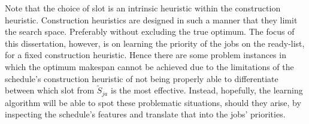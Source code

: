 \begin{comment} %
Preliminary experiments which at each time step all jobs on the ready-list are explored and dispatched according to a (fixed) construction heuristic. The job corresponding to the best resulting makespan (found via analytical methods) is chosen to have the highest priority. The resulting makespan is divided by its theoretical optimal makespan, i.e., the deviation from optimality defined by \cref{eq:ratio}. A histogram for 6-job 5-machine \jsp\ problem instances ($N=500$) is depicted in \cref{fig:slot:smallestvsfirst} using both the intrinsic heuristics: (\subref{fig:slot:first}) first slot chosen and (\subref{fig:slot:small}) slot corresponding to the smallest slot size chosen. Using always the first slot, roughly 26\% of the instances were able to achieve the optimum makespan, however mere 16\% using the smallest slot size. Hence dispatching in the first slot was favoured and will be used throughout the study.
\begin{figure}
\subfloat[First slot]{\texttt{[image: slotsize\_first.eps]}} %
\subfloat[Smallest slot size]{\texttt{[image: slotsize\_small.eps]}} %
\caption{Histogram of deviation from optimality by sequentially dispatching optimal jobs using a fixed construction heuristic.}
\label{fig:slot:smallestvsfirst}
\end{figure}
\end{comment}

Note that the choice of slot is an intrinsic heuristic within the construction heuristic.
Construction heuristics are designed in such a manner that they limit the search space. Preferably without excluding the true optimum. The focus of this dissertation, however, is on learning the priority of the jobs on the ready-list, for a fixed construction heuristic. Hence there are some problem instances in which the optimum makespan cannot be achieved due to the limitations of the schedule's construction heuristic of not being properly able to differentiate between which slot from $\tilde{S}_{ja}$ is the most effective. Instead, hopefully, the learning algorithm will be able to spot these problematic situations, should they arise, by inspecting the schedule's features and translate that into the jobs' priorities.

